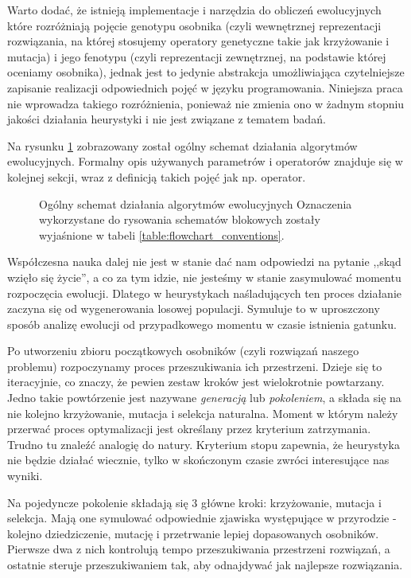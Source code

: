 \documentclass[./FM_mgr.tex]{subfiles}
\begin{document}
Warto dodać, że istnieją implementacje i narzędzia do obliczeń ewolucyjnych które rozróżniają pojęcie genotypu osobnika (czyli wewnętrznej reprezentacji rozwiązania, na której stosujemy operatory genetyczne takie jak krzyżowanie i mutacja) i jego fenotypu (czyli reprezentacji zewnętrznej, na podstawie której oceniamy osobnika), jednak jest to jedynie abstrakcja umożliwiająca czytelniejsze zapisanie realizacji odpowiednich pojęć w języku programowania. Niniejsza praca nie wprowadza takiego rozróżnienia, ponieważ nie zmienia ono w żadnym stopniu jakości działania heurystyki i nie jest związane z tematem badań.

Na rysunku \ref{figure:ea_general} zobrazowany został ogólny schemat działania algorytmów ewolucyjnych. Formalny opis używanych parametrów i operatorów znajduje się w kolejnej sekcji, wraz z definicją takich pojęć jak np. operator.

\begin{figure}
	
	\caption{Ogólny schemat działania algorytmów ewolucyjnych
		\label{figure:ea_general}
	Oznaczenia wykorzystane do rysowania schematów blokowych zostały wyjaśnione w tabeli \ref{table:flowchart_conventions}.}
\end{figure}
%
%

Współczesna nauka dalej nie jest w stanie dać nam odpowiedzi na pytanie ,,skąd wzięło się życie'', a co za tym idzie, nie jesteśmy w stanie zasymulować momentu rozpoczęcia ewolucji.
Dlatego w heurystykach naśladujących ten proces działanie zaczyna się od wygenerowania losowej populacji. 
Symuluje to w uproszczony sposób analizę ewolucji od przypadkowego momentu w czasie istnienia gatunku.

Po utworzeniu zbioru początkowych osobników (czyli rozwiązań naszego problemu) rozpoczynamy proces przeszukiwania ich przestrzeni.
Dzieje się to iteracyjnie, co znaczy, że pewien zestaw kroków jest wielokrotnie powtarzany.
Jedno takie powtórzenie jest nazywane \emph{generacją} lub \emph{pokoleniem}, a składa się na nie kolejno krzyżowanie, mutacja i selekcja naturalna.
Moment w którym należy przerwać proces optymalizacji jest określany przez kryterium zatrzymania. 
Trudno tu znaleźć analogię do natury.
Kryterium stopu zapewnia, że heurystyka nie będzie działać wiecznie, tylko w skończonym czasie zwróci interesujące nas wyniki.

Na pojedyncze pokolenie składają się 3 główne kroki: krzyżowanie, mutacja i selekcja. 
Mają one symulować odpowiednie zjawiska występujące w przyrodzie - kolejno dziedziczenie, mutację i przetrwanie lepiej dopasowanych osobników.
Pierwsze dwa z nich kontrolują tempo przeszukiwania przestrzeni rozwiązań, a ostatnie steruje przeszukiwaniem tak, aby odnajdywać jak najlepsze rozwiązania. 
\end{document}
